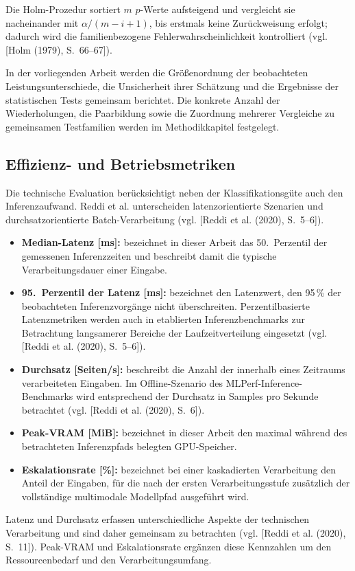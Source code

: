Die Holm-Prozedur sortiert $m$ $p$-Werte aufsteigend und vergleicht sie nacheinander mit $\alpha/(m-i+1)$, bis erstmals keine Zurückweisung erfolgt; dadurch wird die familienbezogene Fehlerwahrscheinlichkeit kontrolliert (vgl. [Holm (1979), S.~66--67]).

In der vorliegenden Arbeit werden die Größenordnung der beobachteten
Leistungsunterschiede, die Unsicherheit ihrer Schätzung und die Ergebnisse der
statistischen Tests gemeinsam berichtet. Die konkrete Anzahl der Wiederholungen,
die Paarbildung sowie die Zuordnung mehrerer Vergleiche zu gemeinsamen
Testfamilien werden im Methodikkapitel festgelegt.

\subsection{Effizienz- und Betriebsmetriken}

Die technische Evaluation berücksichtigt neben der Klassifikationsgüte auch den Inferenzaufwand. Reddi et al. unterscheiden latenzorientierte Szenarien und durchsatzorientierte Batch-Verarbeitung (vgl. [Reddi et al. (2020), S.~5--6]).

\begin{itemize}
    \item \textbf{Median-Latenz [ms]:}
    bezeichnet in dieser Arbeit das 50.\ Perzentil der gemessenen
    Inferenzzeiten und beschreibt damit die typische Verarbeitungsdauer
    einer Eingabe.

    \item \textbf{95.\ Perzentil der Latenz [ms]:}
    bezeichnet den Latenzwert, den 95\,\% der beobachteten
    Inferenzvorgänge nicht überschreiten. Perzentilbasierte
    Latenzmetriken werden auch in etablierten Inferenzbenchmarks zur
    Betrachtung langsamerer Bereiche der Laufzeitverteilung eingesetzt
    (vgl. [Reddi et al. (2020), S.~5--6]).

    \item \textbf{Durchsatz [Seiten/s]:}
    beschreibt die Anzahl der innerhalb eines Zeitraums verarbeiteten
    Eingaben. Im Offline-Szenario des MLPerf-Inference-Benchmarks wird
    entsprechend der Durchsatz in Samples pro Sekunde betrachtet
    (vgl. [Reddi et al. (2020), S.~6]).

    \item \textbf{Peak-VRAM [MiB]:}
    bezeichnet in dieser Arbeit den maximal während des betrachteten
    Inferenzpfads belegten GPU-Speicher.

    \item \textbf{Eskalationsrate [\%]:}
    bezeichnet bei einer kaskadierten Verarbeitung den Anteil der Eingaben,
    für die nach der ersten Verarbeitungsstufe zusätzlich der vollständige
    multimodale Modellpfad ausgeführt wird.
\end{itemize}

Latenz und Durchsatz erfassen unterschiedliche Aspekte der technischen
Verarbeitung und sind daher gemeinsam zu betrachten
(vgl. [Reddi et al. (2020), S.~11]). Peak-VRAM und Eskalationsrate ergänzen
diese Kennzahlen um den Ressourcenbedarf und den Verarbeitungsumfang.

